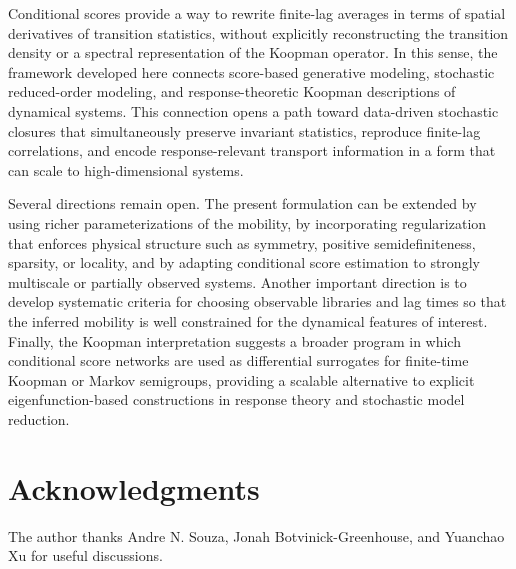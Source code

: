 \documentclass[11pt,twoside,fleqn]{article}
\begin{document}
Conditional scores provide a way to rewrite finite-lag averages in terms of
spatial derivatives of transition statistics, without explicitly reconstructing
the transition density or a spectral representation of the Koopman operator. In
this sense, the framework developed here connects score-based generative
modeling, stochastic reduced-order modeling, and response-theoretic Koopman
descriptions of dynamical systems. This connection opens a path toward
data-driven stochastic closures that simultaneously preserve invariant
statistics, reproduce finite-lag correlations, and encode response-relevant
transport information in a form that can scale to high-dimensional systems.

Several directions remain open. The present formulation can be extended by using
richer parameterizations of the mobility, by incorporating regularization that
enforces physical structure such as symmetry, positive semidefiniteness,
sparsity, or locality, and by adapting conditional score estimation to strongly
multiscale or partially observed systems. Another important direction is to
develop systematic criteria for choosing observable libraries and lag times so
that the inferred mobility is well constrained for the dynamical features of
interest. Finally, the Koopman interpretation suggests a broader program in
which conditional score networks are used as differential surrogates for
finite-time Koopman or Markov semigroups, providing a scalable alternative to
explicit eigenfunction-based constructions in response theory and stochastic
model reduction.

\section*{Acknowledgments}

The author thanks Andre N. Souza, Jonah Botvinick-Greenhouse, and Yuanchao Xu for useful discussions.

\clearpage
\onecolumn
{}
\appendix
\setcounter{section}{0}
\setcounter{subsection}{0}
\setcounter{equation}{0}
\setcounter{figure}{0}
\setcounter{table}{0}
\renewcommand{\thesection}{S\arabic{section}}
\renewcommand{\thesubsection}{S\arabic{section}.\arabic{subsection}}
\renewcommand{\theequation}{S\arabic{equation}}
\renewcommand{\thefigure}{S\arabic{figure}}
\renewcommand{\thetable}{S\arabic{table}}
\renewcommand{\theHsection}{appendix.\arabic{section}}
\renewcommand{\theHsubsection}{appendix.\arabic{section}.\arabic{subsection}}
\renewcommand{\theHequation}{appendix.\arabic{equation}}
\renewcommand{\theHfigure}{appendix.\arabic{figure}}
\renewcommand{\theHtable}{appendix.\arabic{table}}
\end{document}
